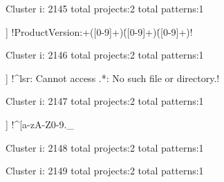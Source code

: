 Cluster i: 2145
total projects:2
total patterns:1
\begin{multicols}{1}
\begin{description}[noitemsep,topsep=0pt]
\item [[2] ] \cverb!ProductVersion:\s+([0-9]+)\.([0-9]+)\.([0-9]+)!
\end{description}
\end{multicols}







Cluster i: 2146
total projects:2
total patterns:1
\begin{multicols}{1}
\begin{description}[noitemsep,topsep=0pt]
\item [[2] ] \cverb!^lsr: Cannot access .*: No such file or directory.!
\end{description}
\end{multicols}







Cluster i: 2147
total projects:2
total patterns:1
\begin{multicols}{1}
\begin{description}[noitemsep,topsep=0pt]
\item [[2] ] \cverb!^[a-zA-Z0-9._%
\end{description}
\end{multicols}







Cluster i: 2148
total projects:2
total patterns:1
\begin{multicols}{1}
\end{multicols}







Cluster i: 2149
total projects:2
total patterns:1
\begin{multicols}{1}
\end{multicols}







